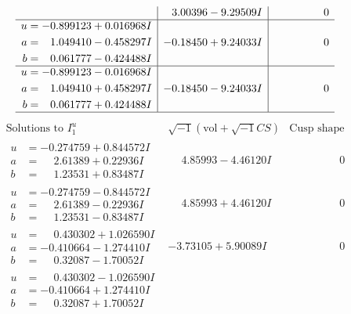 \documentclass[1p]{elsarticle_modified}
\theoremstyle{definition}
\newcommand{\I}{\sqrt{-1}}
\begin{document}
$$\begin{array}{c|c|c}
 & \phantom{-}3.00396 - 9.29509 I & \phantom{-0.000000 } 0 \\ \hline\begin{aligned}
u &= -0.899123 + 0.016968 I \\
a &= \phantom{-}1.049410 - 0.458297 I \\
b &= \phantom{-}0.061777 - 0.424488 I\end{aligned}
 & -0.18450 + 9.24033 I & \phantom{-0.000000 } 0 \\ \hline\begin{aligned}
u &= -0.899123 - 0.016968 I \\
a &= \phantom{-}1.049410 + 0.458297 I \\
b &= \phantom{-}0.061777 + 0.424488 I\end{aligned}
 & -0.18450 - 9.24033 I & \phantom{-0.000000 } 0\\
 \hline 
 \end{array}$$\newpage$$\begin{array}{c|c|c}  
\text{Solutions to }I^u_{1}& \I (\text{vol} + \sqrt{-1}CS) & \text{Cusp shape}\\
 \hline 
\begin{aligned}
u &= -0.274759 + 0.844572 I \\
a &= \phantom{-}2.61389 + 0.22936 I \\
b &= \phantom{-}1.23531 + 0.83487 I\end{aligned}
 & \phantom{-}4.85993 - 4.46120 I & \phantom{-0.000000 } 0 \\ \hline\begin{aligned}
u &= -0.274759 - 0.844572 I \\
a &= \phantom{-}2.61389 - 0.22936 I \\
b &= \phantom{-}1.23531 - 0.83487 I\end{aligned}
 & \phantom{-}4.85993 + 4.46120 I & \phantom{-0.000000 } 0 \\ \hline\begin{aligned}
u &= \phantom{-}0.430302 + 1.026590 I \\
a &= -0.410664 - 1.274410 I \\
b &= \phantom{-}0.32087 - 1.70052 I\end{aligned}
 & -3.73105 + 5.90089 I & \phantom{-0.000000 } 0 \\ \hline\begin{aligned}
u &= \phantom{-}0.430302 - 1.026590 I \\
a &= -0.410664 + 1.274410 I \\
b &= \phantom{-}0.32087 + 1.70052 I\end{aligned}

\end{array}$$
\end{document}
